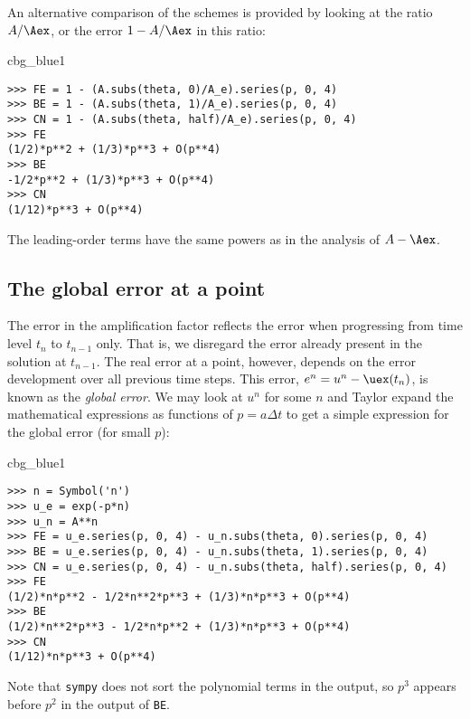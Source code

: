 \documentclass[graybox,sectrefs,envcountresetchap,open=right,final]{svmonodo}
\newenvironment{_cod_tight}[1]{
   \def\FrameCommand{\colorbox{#1}}
   \FrameRule0.6pt\MakeFramed {\FrameRestore}\vskip3mm}
   {\vskip0mm\endMakeFramed}
\newenvironment{cod}[1]{
\bgroup\rmfamily
\fboxsep=0mm\relax
\begin{_cod_tight}{#1}
\list{}{\parsep=-2mm\parskip=0mm\topsep=0pt\leftmargin=2mm
\rightmargin=2\leftmargin\leftmargin=4pt\relax}
\item\relax}
{\endlist\end{_cod_tight}\egroup}
\begin{document}

An alternative comparison of the schemes is provided by looking at the
ratio $A/\Aex$, or the error $1-A/\Aex$ in this ratio:

\begin{cod}{cbg_blue1}\begin{Verbatim}[numbers=none,fontsize=\fontsize{9pt}{9pt},baselinestretch=0.95,xleftmargin=2mm]
>>> FE = 1 - (A.subs(theta, 0)/A_e).series(p, 0, 4)
>>> BE = 1 - (A.subs(theta, 1)/A_e).series(p, 0, 4)
>>> CN = 1 - (A.subs(theta, half)/A_e).series(p, 0, 4)
>>> FE
(1/2)*p**2 + (1/3)*p**3 + O(p**4)
>>> BE
-1/2*p**2 + (1/3)*p**3 + O(p**4)
>>> CN
(1/12)*p**3 + O(p**4)
\end{Verbatim}
\end{cod}
\noindent
The leading-order terms have the same powers as
in the analysis of $A-\Aex$.

\subsection{The global error at a point}
\label{decay:analysis:gobal:error}


The error in the amplification factor reflects the error when
progressing from time level $t_n$ to $t_{n-1}$ only. That is,
we disregard the error already present in the solution at $t_{n-1}$.
The real error at a point, however, depends on the error development
over all previous time steps. This error,
$e^n = u^n-\uex(t_n)$, is known as the \emph{global error}. We
may look at $u^n$ for some $n$ and Taylor expand the
mathematical expressions as functions of $p=a\Delta t$ to get a simple
expression for the global error (for small $p$):

\begin{cod}{cbg_blue1}\begin{Verbatim}[numbers=none,fontsize=\fontsize{9pt}{9pt},baselinestretch=0.95,xleftmargin=2mm]
>>> n = Symbol('n')
>>> u_e = exp(-p*n)
>>> u_n = A**n
>>> FE = u_e.series(p, 0, 4) - u_n.subs(theta, 0).series(p, 0, 4)
>>> BE = u_e.series(p, 0, 4) - u_n.subs(theta, 1).series(p, 0, 4)
>>> CN = u_e.series(p, 0, 4) - u_n.subs(theta, half).series(p, 0, 4)
>>> FE
(1/2)*n*p**2 - 1/2*n**2*p**3 + (1/3)*n*p**3 + O(p**4)
>>> BE
(1/2)*n**2*p**3 - 1/2*n*p**2 + (1/3)*n*p**3 + O(p**4)
>>> CN
(1/12)*n*p**3 + O(p**4)
\end{Verbatim}
\end{cod}
\noindent
Note that \texttt{sympy} does not sort the polynomial terms in the output,
so $p^3$ appears before $p^2$ in the output of \texttt{BE}.
\end{document}
